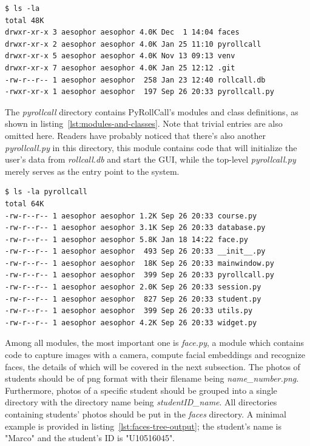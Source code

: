 \begin{lstlisting}[numbers=none,xleftmargin=0em,caption={Layout of PyRollCall's root directory.},label={lst:proj-root-layout}]
$ ls -la
total 48K
drwxr-xr-x 3 aesophor aesophor 4.0K Dec  1 14:04 faces
drwxr-xr-x 2 aesophor aesophor 4.0K Jan 25 11:10 pyrollcall
drwxr-xr-x 5 aesophor aesophor 4.0K Nov 13 09:13 venv
drwxr-xr-x 7 aesophor aesophor 4.0K Jan 25 12:12 .git
-rw-r--r-- 1 aesophor aesophor  258 Jan 23 12:40 rollcall.db
-rwxr-xr-x 1 aesophor aesophor  197 Sep 26 20:33 pyrollcall.py
\end{lstlisting}
\vspace{0.2cm}

The \emph{pyrollcall} directory contains PyRollCall's modules and class definitions,
as shown in listing~\ref{lst:modules-and-classes}. Note that trivial entries are also
omitted here. Readers have probably noticed that there's also another \emph{pyrollcall.py}
in this directory, this module contains code that will initialize the user's data
from \emph{rollcall.db} and start the GUI, while the top-level \emph{pyrollcall.py} merely serves as the entry point to the system.

\begin{lstlisting}[numbers=none,xleftmargin=0em,caption={PyRollCall's modules and classes.},label={lst:modules-and-classes}]
$ ls -la pyrollcall
total 64K
-rw-r--r-- 1 aesophor aesophor 1.2K Sep 26 20:33 course.py
-rw-r--r-- 1 aesophor aesophor 3.1K Sep 26 20:33 database.py
-rw-r--r-- 1 aesophor aesophor 5.8K Jan 18 14:22 face.py
-rw-r--r-- 1 aesophor aesophor  493 Sep 26 20:33 __init__.py
-rw-r--r-- 1 aesophor aesophor  18K Sep 26 20:33 mainwindow.py
-rw-r--r-- 1 aesophor aesophor  399 Sep 26 20:33 pyrollcall.py
-rw-r--r-- 1 aesophor aesophor 2.0K Sep 26 20:33 session.py
-rw-r--r-- 1 aesophor aesophor  827 Sep 26 20:33 student.py
-rw-r--r-- 1 aesophor aesophor  399 Sep 26 20:33 utils.py
-rw-r--r-- 1 aesophor aesophor 4.2K Sep 26 20:33 widget.py
\end{lstlisting}
\vspace{0.2cm}

Among all modules, the most important one is \emph{face.py}, a module which contains code
to capture images with a camera, compute facial embeddings and recognize faces,
the details of which will be covered in the next subsection. The photos of
students should be of png format with their filename being \emph{name\_number.png}.
Furthermore, photos of a specific student should be grouped into a single directory
with the directory name being \emph{studentID\_name}. All directories containing students' photos
should be put in the \emph{faces} directory.
A minimal example is provided in listing~\ref{lst:faces-tree-output};
the student's name is "Marco" and the student's ID is "U10516045".
\vspace{0.2cm}

